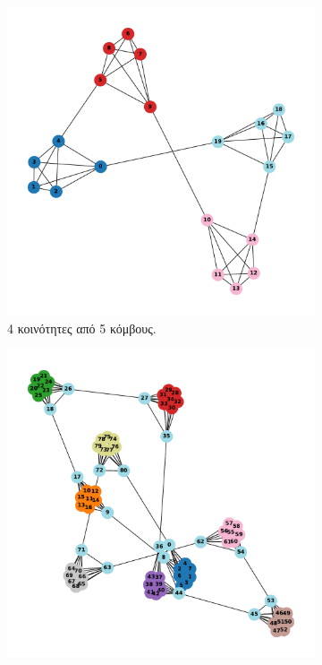 \documentclass[10pt, letterpaper]{article}
\begin{document}
\begin{figure}[h]
  \centering
  \begin{subfigure}{0.3\textwidth}
      \includegraphics[width=\textwidth]{cluster_4,5newman_auto.pdf}
      \caption{4 κοινότητες από 5 κόμβους.}
      \label{9a}
  \end{subfigure}
  \begin{subfigure}{0.3\textwidth}
      \includegraphics[width=\textwidth]{cluster_9,9newman_auto.pdf}

\end{subfigure}
\end{figure}
\end{document}
